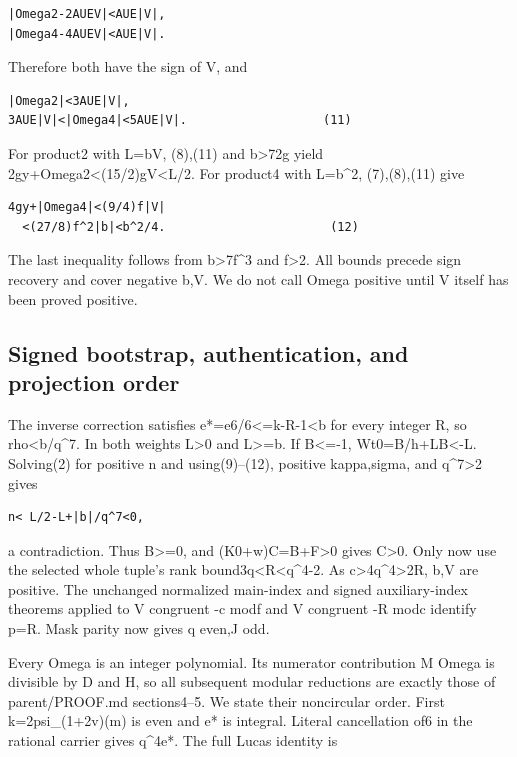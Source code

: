 \begin{verbatim}
|Omega2-2AUEV|<AUE|V|,
|Omega4-4AUEV|<AUE|V|.
\end{verbatim}

Therefore both have the sign of V, and

\begin{verbatim}
|Omega2|<3AUE|V|,
3AUE|V|<|Omega4|<5AUE|V|.                   (11)
\end{verbatim}

For product2 with L=bV, (8),(11) and \textbar b\textbar\textgreater72g
yield
2gy+\textbar Omega2\textbar\textless(15/2)g\textbar V\textbar\textless L/2.
For product4 with L=b\^{}2, (7),(8),(11) give

\begin{verbatim}
4gy+|Omega4|<(9/4)f|V|
  <(27/8)f^2|b|<b^2/4.                       (12)
\end{verbatim}

The last inequality follows from \textbar b\textbar\textgreater7f\^{}3
and f\textgreater2. All bounds precede sign recovery and cover negative
b,V. We do not call Omega positive until V itself has been proved
positive.

\subsection{Signed bootstrap, authentication, and projection
order}\label{signed-bootstrap-authentication-and-projection-order}

The inverse correction satisfies e*=e6/6\textless=k-R-1\textless b for
every integer R, so rho\textless\textbar b\textbar/q\^{}7. In both
weights L\textgreater0 and L\textgreater=\textbar b\textbar. If
B\textless=-1, Wt0=B/h+LB\textless-L. Solving(2) for positive n and
using(9)--(12), positive kappa,sigma, and q\^{}7\textgreater2 gives

\begin{verbatim}
n< L/2-L+|b|/q^7<0,
\end{verbatim}

a contradiction. Thus B\textgreater=0, and (K0+w)C=B+F\textgreater0
gives C\textgreater0. Only now use the selected whole tuple's rank
bound3q\textless R\textless q\^{}4-2. As
c\textgreater4q\^{}4\textgreater2R, b,V are positive. The unchanged
normalized main-index and signed auxiliary-index theorems applied to V
congruent -c modf and V congruent -R modc identify p=R. Mask parity now
gives q even,J odd.

Every Omega is an integer polynomial. Its numerator contribution M Omega
is divisible by D and H, so all subsequent modular reductions are
exactly those of parent/PROOF.md sections4--5. We state their
noncircular order. First k=2psi\_(1+2v)(m) is even and e* is integral.
Literal cancellation of6 in the rational carrier gives
q\^{}4\textbar e*. The full Lucas identity is

